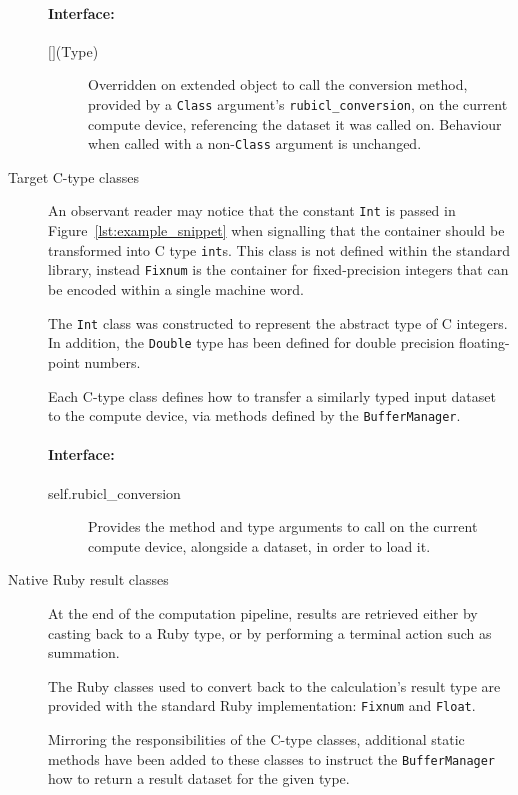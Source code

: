 \begin{description}
\paragraph*{Interface:}
\begin{description}
  \item[$\lbrack\rbrack$(Type)] Overridden on extended object to call the conversion method, provided by a \verb|Class| argument's \verb|rubicl_conversion|, on the current compute device, referencing the dataset it was called on. Behaviour when called with a non-\verb|Class| argument is unchanged.
\end{description}

  \item[Target C-type classes]
An observant reader may notice that the constant \verb|Int| is passed in Figure~\ref{lst:example_snippet} when signalling that the container should be transformed into C type \verb|int|s. This class is not defined within the standard library, instead \verb|Fixnum| is the container for fixed-precision integers that can be encoded within a single machine word.

The \verb|Int| class was constructed to represent the abstract type of C integers. In addition, the \verb|Double| type has been defined for double precision floating-point numbers.

Each C-type class defines how to transfer a similarly typed input dataset to the compute device, via methods defined by the \verb|BufferManager|.

\paragraph*{Interface:}
\begin{description}
  \item[self.rubicl\_conversion] Provides the method and type arguments to call on the current compute device, alongside a dataset, in order to load it.
\end{description}

\item[Native Ruby result classes]
At the end of the computation pipeline, results are retrieved either by casting back to a Ruby type, or by performing a terminal action such as summation.

The Ruby classes used to convert back to the calculation's result type are provided with the standard Ruby implementation: \verb|Fixnum| and \verb|Float|.

Mirroring the responsibilities of the C-type classes, additional static methods have been added to these classes to instruct the \verb|BufferManager| how to return a result dataset for the given type.

\end{description}
